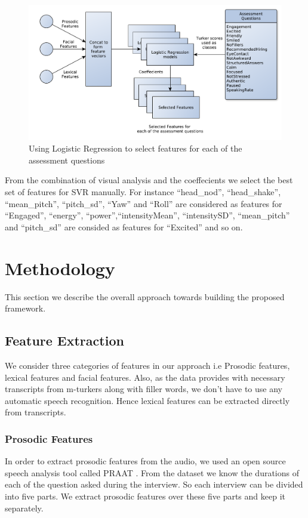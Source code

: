 \documentclass[11pt]{article}
\begin{document}
\begin{figure}[H]
\begin{center}
\includegraphics[width=0.8\columnwidth]{figures/logistic_regression.pdf}
\caption{Using Logistic Regression to select features for each of the assessment questions}
\label{fig:logistic_regression}
\end{center}
\end{figure}
From the combination of visual analysis and the coeffecients we select the best set of features for SVR manually. For instance ``head\_nod'', ``head\_shake'', ``mean\_pitch'', ``pitch\_sd'', ``Yaw'' and ``Roll'' are considered as features for ``Engaged'', ``energy'', ``power'',``intensityMean'', ``intensitySD'', ``mean\_pitch'' and ``pitch\_sd'' are consided as features for ``Excited'' and so on.

\section{Methodology}
\label{sec:methodology}
This section we describe the overall approach towards building the proposed framework.

\subsection{Feature Extraction}
We consider three categories of features in our approach i.e Prosodic features, lexical features and facial features. Also, as the data provides with necessary transcripts from m-turkers along with filler words, we don't have to use any automatic speech recognition. Hence lexical features can be extracted directly from transcripts.
\subsubsection{Prosodic Features}
In order to extract prosodic features from the audio, we used an open source speech analysis tool called PRAAT \cite{naim2015automated}. From the dataset we know the durations of each of the question asked during the interview. So each interview can be divided into five parts. We extract prosodic features over these five parts and keep it separately.
\end{document}
